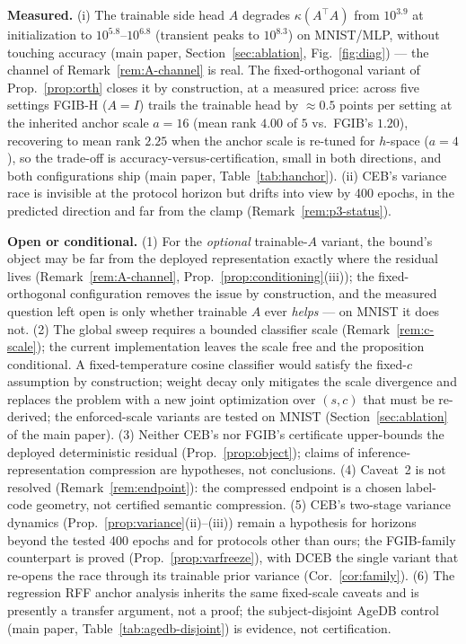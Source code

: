 \begin{remark}
\textbf{Measured.} (i) The trainable side head $A$ degrades $\kappa(A^{\top}A)$ from
$10^{3.9}$ at initialization to $10^{5.8}$--$10^{6.8}$ (transient peaks to $10^{8.3}$)
on MNIST/MLP, without touching accuracy (main paper, Section~\ref{sec:ablation},
Fig.~\ref{fig:diag}) --- the channel of Remark~\ref{rem:A-channel} is real. The
fixed-orthogonal variant of Prop.~\ref{prop:orth} closes it by construction, at a
measured price: across five settings FGIB-H ($A{=}I$) trails the trainable head by
$\approx 0.5$ points per setting at the inherited anchor scale $a=16$ (mean rank
$4.00$ of $5$ vs.\ FGIB's $1.20$), recovering to mean rank $2.25$ when the anchor
scale is re-tuned for $h$-space ($a=4$), so the trade-off is
accuracy-versus-certification, small in both directions, and both configurations ship
(main paper, Table~\ref{tab:hanchor}). (ii) CEB's variance race is invisible at the protocol
horizon but drifts into view by 400 epochs, in the predicted direction and far from the
clamp (Remark~\ref{rem:p3-status}).

\textbf{Open or conditional.} (1) For the \emph{optional} trainable-$A$ variant, the
bound's object may be far from the deployed representation exactly where the residual
lives (Remark~\ref{rem:A-channel}, Prop.~\ref{prop:conditioning}(iii)); the
fixed-orthogonal configuration removes the issue by construction, and the measured
question left open is only whether trainable $A$ ever \emph{helps} --- on MNIST it does
not.
(2) The global sweep requires a bounded classifier scale
(Remark~\ref{rem:c-scale}); the current implementation leaves the scale free and the
proposition conditional. A fixed-temperature cosine classifier would satisfy the
fixed-$c$ assumption by construction; weight decay only mitigates the scale divergence
and replaces the problem with a new joint optimization over $(s,c)$ that must be
re-derived; the enforced-scale variants are tested on MNIST
(Section~\ref{sec:ablation} of the main paper). (3) Neither CEB's nor FGIB's certificate
upper-bounds the deployed
deterministic residual (Prop.~\ref{prop:object}); claims of inference-representation
compression are hypotheses, not conclusions. (4) Caveat~2 is not resolved
(Remark~\ref{rem:endpoint}): the compressed endpoint is a chosen label-code geometry,
not certified semantic compression. (5) CEB's two-stage variance dynamics
(Prop.~\ref{prop:variance}(ii)--(iii)) remain a hypothesis for horizons beyond the
tested 400 epochs and for protocols other than ours; the FGIB-family counterpart is
proved (Prop.~\ref{prop:varfreeze}), with DCEB the single variant that re-opens the
race through its trainable prior variance (Cor.~\ref{cor:family}). (6) The regression
RFF anchor analysis inherits the same
fixed-scale caveats and is presently a transfer argument, not a proof; the
subject-disjoint AgeDB control (main paper, Table~\ref{tab:agedb-disjoint}) is
evidence, not certification.
\end{remark}
